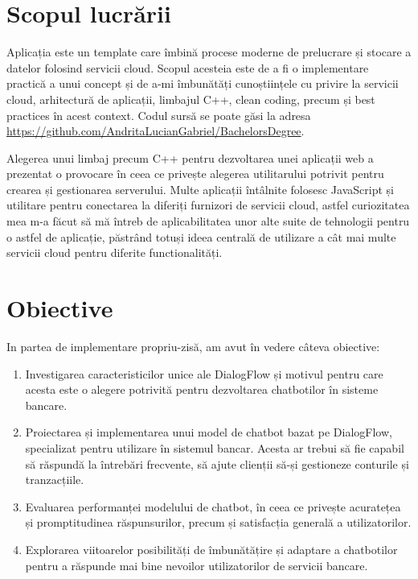\section{Scopul lucrării}

Aplicația este un template care îmbină procese moderne de prelucrare și stocare a datelor folosind servicii cloud. Scopul acesteia este de a fi o implementare practică a unui concept și de a-mi îmbunătăți cunoștiințele cu privire la servicii cloud, arhitectură de aplicații, limbajul C++, clean coding, precum și best practices în acest context. Codul sursă se poate găsi la adresa \href{https://github.com/AndritaLucianGabriel/BachelorsDegree}{https://github.com/AndritaLucianGabriel/BachelorsDegree}.

Alegerea unui limbaj precum C++ pentru dezvoltarea unei aplicații web a prezentat o provocare în ceea ce privește alegerea utilitarului potrivit pentru crearea și gestionarea serverului. Multe aplicații întâlnite folosesc JavaScript și utilitare pentru conectarea la diferiți furnizori de servicii cloud, astfel curiozitatea mea m-a făcut să mă întreb de aplicabilitatea unor alte suite de tehnologii pentru o astfel de aplicație, păstrând totuși ideea centrală de utilizare a cât mai multe servicii cloud pentru diferite functionalități.

\section{Obiective}

In partea de implementare propriu-zisă, am avut în vedere câteva obiective:

\begin{enumerate}
    \item Investigarea caracteristicilor unice ale DialogFlow și motivul pentru care acesta este o alegere potrivită pentru dezvoltarea chatbotilor în sisteme bancare.
    \item Proiectarea și implementarea unui model de chatbot bazat pe DialogFlow, specializat pentru utilizare în sistemul bancar. Acesta ar trebui să fie capabil să răspundă la întrebări frecvente, să ajute clienții să-și gestioneze conturile și tranzacțiile.
    \item Evaluarea performanței modelului de chatbot, în ceea ce privește acuratețea și promptitudinea răspunsurilor, precum și satisfacția generală a utilizatorilor.
    \item Explorarea viitoarelor posibilități de îmbunătățire și adaptare a chatbotilor pentru a răspunde mai bine nevoilor utilizatorilor de servicii bancare.
\end{enumerate}


